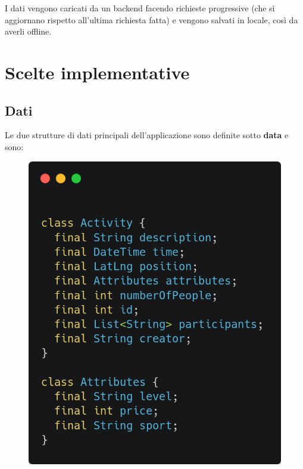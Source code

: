 \documentclass[a4paper,12pt]{article}
\begin{document}
I dati vengono caricati da un backend facendo richieste progressive (che si aggiornano rispetto all'ultima richiesta fatta) e vengono salvati in locale, così da averli offline.


\newpage
\section{Scelte implementative}

\subsection{Dati}

Le due strutture di dati principali dell'applicazione sono definite sotto \textbf{data} e sono:

\begin{figure}[h]
    \centering
    \begin{minipage}{0.45\textwidth}
        \centering
        \includegraphics[width=0.9\linewidth]{img/activity.png}
    \end{minipage}\hfill
    \begin{minipage}{0.45\textwidth}
        \centering

\end{minipage}
\end{figure}
\end{document}
